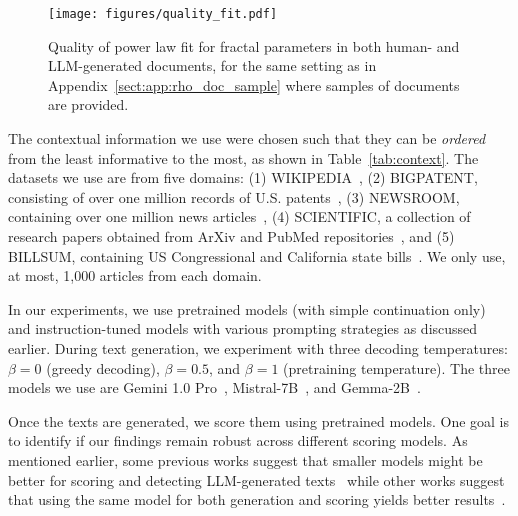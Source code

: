 \begin{figure*}[t]
    \centering
    \texttt{[image: figures/quality\_fit.pdf]}
    \caption{Quality of power law fit for fractal parameters in both human- and LLM-generated documents, for the same setting as in Appendix~\ref{sect:app:rho_doc_sample} where samples of documents are provided.}
    \label{fig:quality_fit}
\end{figure*}

The contextual information we use were chosen such that they can be \emph{ordered} from the least informative to the most, as shown in Table~\ref{tab:context}. The datasets we use are from five domains: (1) WIKIPEDIA~\citep{wikidump}, (2) BIGPATENT, consisting of over one million records of U.S. patents~\citep{sharma2019bigpatent}, (3) NEWSROOM, containing over one million news articles~\citep{Grusky_2018}, (4) SCIENTIFIC, a collection of research papers obtained from ArXiv and PubMed repositories~\citep{Cohan_2018}, and (5) BILLSUM, containing US Congressional and California state bills~\citep{kornilova2019billsum}. We only use, at most, 1,000 articles from each domain.


In our experiments, we use pretrained models (with simple continuation only) and instruction-tuned models with various prompting strategies as discussed earlier. During text generation, we experiment with three decoding temperatures: $\beta=0$ (greedy decoding), $\beta=0.5$, and $\beta=1$ (pretraining temperature). The three models we use are Gemini 1.0 Pro~\citep{geminiteam2024geminifamilyhighlycapable}, Mistral-7B~\citep{jiang2023mistral7b}, and Gemma-2B~\citep{gemmateam2024gemmaopenmodelsbased}.

Once the texts are generated, we score them using pretrained models. One goal is to identify if our findings remain robust across different scoring models. As mentioned earlier, some previous works suggest that smaller models might be better for scoring and detecting LLM-generated texts~\citep{mireshghallah-etal-2024-smaller} while other works suggest that using the same model for both generation and scoring yields better results~\citep{fagni2021tweepfake,10.5555/3618408.3619446}. 

